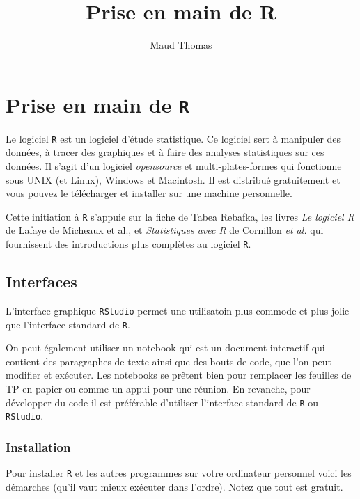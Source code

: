 \documentclass[11pt]{article}
\title{Prise en main de R}
\author{Maud Thomas}
\date{}
\numberwithin{equation}{section}
\theoremstyle{remark}
\begin{document}
\maketitle
\setcounter{page}{1}
\tableofcontents
\section{Prise en main de \texttt R}


Le logiciel \texttt R est un logiciel d'étude statistique. Ce logiciel
sert à manipuler des données, à tracer des graphiques et à faire des analyses statistiques sur ces données.
Il s'agit d'un logiciel {\it opensource} et multi-plates-formes qui fonctionne sous UNIX (et Linux), Windows et Macintosh. 
Il est distribué gratuitement et vous pouvez le télécharger et installer sur une machine personnelle. 

Cette initiation à \texttt R  s'appuie sur la fiche de Tabea Rebafka, les livres {\it Le logiciel R} de Lafaye de Micheaux et al., et {\it Statistiques avec R} de Cornillon {\it et al.} qui fournissent des introductions plus complètes  au logiciel \texttt{R}. 


\subsection{Interfaces}

L'interface graphique \texttt{RStudio} permet une utilisatoin plus commode et plus jolie que l'interface standard de \texttt{R}. 

On peut également utiliser un notebook qui est un document interactif qui contient des paragraphes de texte ainsi que des bouts de code, que l'on peut modifier et exécuter. Les notebooks se prêtent bien pour remplacer les feuilles de TP en papier ou comme un appui pour une réunion.   %
En revanche, pour développer du code il est préférable d'utiliser l'interface standard de \texttt R ou \texttt{RStudio}.


\subsubsection{Installation}
 Pour  installer \texttt R et   les autres programmes sur votre ordinateur personnel voici les démarches (qu'il vaut mieux exécuter dans l'ordre). Notez que tout est gratuit.
\end{document}
